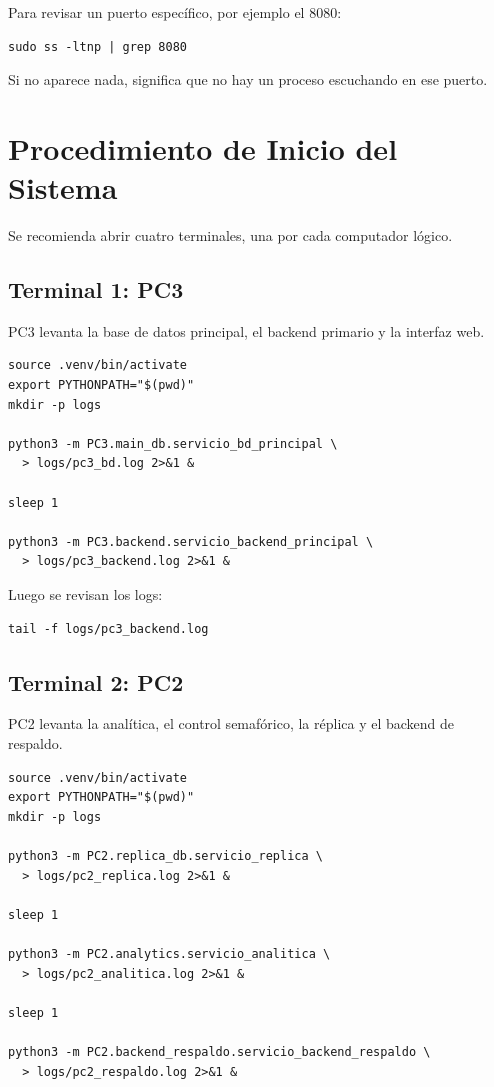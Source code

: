 \documentclass[12pt, a4paper]{article}
\begin{document}
Para revisar un puerto específico, por ejemplo el 8080:

\begin{verbatim}
sudo ss -ltnp | grep 8080
\end{verbatim}

Si no aparece nada, significa que no hay un proceso escuchando en ese puerto.

\section{Procedimiento de Inicio del Sistema}

Se recomienda abrir cuatro terminales, una por cada computador lógico.

\subsection{Terminal 1: PC3}

PC3 levanta la base de datos principal, el backend primario y la interfaz web.

\begin{verbatim}
source .venv/bin/activate
export PYTHONPATH="$(pwd)"
mkdir -p logs

python3 -m PC3.main_db.servicio_bd_principal \
  > logs/pc3_bd.log 2>&1 &

sleep 1

python3 -m PC3.backend.servicio_backend_principal \
  > logs/pc3_backend.log 2>&1 &
\end{verbatim}

Luego se revisan los logs:

\begin{verbatim}
tail -f logs/pc3_backend.log
\end{verbatim}

\subsection{Terminal 2: PC2}

PC2 levanta la analítica, el control semafórico, la réplica y el backend de respaldo.

\begin{verbatim}
source .venv/bin/activate
export PYTHONPATH="$(pwd)"
mkdir -p logs

python3 -m PC2.replica_db.servicio_replica \
  > logs/pc2_replica.log 2>&1 &

sleep 1

python3 -m PC2.analytics.servicio_analitica \
  > logs/pc2_analitica.log 2>&1 &

sleep 1

python3 -m PC2.backend_respaldo.servicio_backend_respaldo \
  > logs/pc2_respaldo.log 2>&1 &
\end{verbatim}
\end{document}
